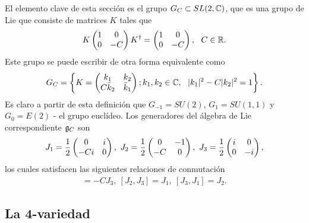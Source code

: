 El elemento clave de esta sección es el grupo $G_C\subset SL(2,\mathbb{C})$, que es una grupo de Lie que consiste de matrices $K$ tales que
\begin{align}
	K\begin{pmatrix}
	1 & 0\\
	0 & -C
	\end{pmatrix}K^\dagger=\begin{pmatrix}
	1 & 0\\
	0 & -C
	\end{pmatrix}, \ \ C\in\mathbb{R}.
\end{align}
Este grupo se puede escribir de otra forma equivalente como
\begin{align}
	G_C = \left\{ K=\begin{pmatrix}
	k_1 & k_2\\
	C\bar k_2 & \bar k_1
	\end{pmatrix};k_1,k_2\in\mathbb{C}, \ \ |k_1|^2-C|k_2|^2=1\right\}.
\end{align}
Es claro a partir de esta definición que $G_{-1}=SU(2)$, $G_1=SU(1,1)$ y $G_0=E(2)$ - el grupo euclídeo. Los generadores del álgebra de Lie correspondiente $\mathfrak{g}_C$ son
\begin{align}
	J_1=\frac{1}{2}\begin{pmatrix}
	0 & i\\ -Ci & 0
	\end{pmatrix}, \ J_2=\frac{1}{2}\begin{pmatrix}
	0 & -1\\ -C & 0
	\end{pmatrix}, \ J_3=\frac{1}{2}\begin{pmatrix}
	i & 0\\ 0 & -i
	\end{pmatrix}, \label{eq:4.2.1.3}
\end{align}
los cuales satisfacen las siguientes relaciones de conmutación
\begin{align}
	[J_1,J_2] = -CJ_3, \ [J_2,J_3]=J_1, \ [J_3,J_1]=J_2.
\end{align}

\subsection{La 4-variedad}

